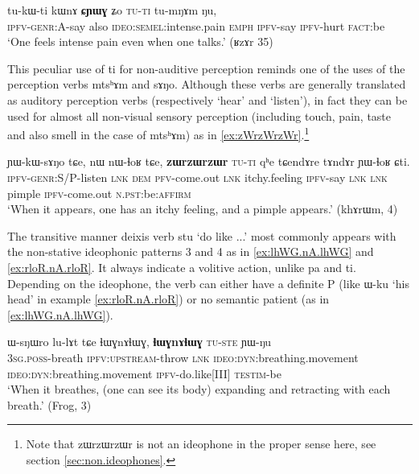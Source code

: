 \documentclass[oldfontcommands,oneside,a4paper,11pt]{article}
\newcommand{\ipa}[1]{{\phon \mbox{#1}}} %
\begin{document}
\begin{exe}
\ex \label{ex:CYWG.Zo}
\gll
\ipa{tu-kɯ-ti} 	\ipa{kɯnɤ} 	\ipa{\textbf{ɕɲɯɣ}} 	\ipa{ʑo} 	\textsc{\ipa{tu-ti}} 	\ipa{tu-mŋɤm} 	\ipa{ŋu,} \\
\textsc{ipfv-genr:A}-say also \textsc{ideo:semel}:intense.pain \textsc{emph} \textsc{ipfv}-say \textsc{ipfv}-hurt \textsc{fact}:be \\
\glt `One feels intense pain even when one talks.' (ʁzɤr 35)
\end{exe}

This peculiar use of \ipa{ti} for non-auditive perception reminds one of the uses of the perception verbs  \ipa{mtsʰɤm} and \ipa{sɤŋo}. Although these verbs are generally translated as auditory perception verbs (respectively `hear' and `listen'), in fact they    can be used for almost all  non-visual sensory perception (including touch, pain, taste and also smell in the case of    \ipa{mtsʰɤm}) as in \ref{ex:zWrzWrzWr}.\footnote{Note that \ipa{zɯrzɯrzɯr}  is not an ideophone in the proper sense here, see section \ref{sec:non.ideophones}. }
 
\begin{exe}
\ex \label{ex:zWrzWrzWr}
\gll
\ipa{ɲɯ-kɯ-sɤŋo} 	\ipa{tɕe,} 	\ipa{nɯ} 	\ipa{nɯ-ɬoʁ} 	\ipa{tɕe,} 	\ipa{\textbf{zɯrzɯrzɯr}} 	\textsc{\ipa{tu-ti}} 	\ipa{qʰe} 	\ipa{tɕendɤre} 	\ipa{tɤndɤr} 	\ipa{ɲɯ-ɬoʁ} 	\ipa{ɕti.} 	\\
\textsc{ipfv-genr}:S/P-listen \textsc{lnk} \textsc{dem} \textsc{pfv}-come.out \textsc{lnk} itchy.feeling \textsc{ipfv}-say \textsc{lnk}  \textsc{lnk} pimple \textsc{ipfv}-come.out \textsc{n.pst:}be:\textsc{affirm} \\
\glt `When it appears, one has an itchy feeling, and a pimple appears.' (khɤrɯm, 4)
\end{exe}

The transitive manner deixis verb \ipa{stu} `do like ...' most commonly appears with the non-stative ideophonic patterns 3 and 4 as in \ref{ex:lhWG.nA.lhWG} and \ref{ex:rloR.nA.rloR}. It always indicate a volitive action, unlike \ipa{pa} and \ipa{ti}. Depending on the ideophone, the verb can either have a definite P (like \ipa{ɯ-ku} `his head' in example \ref{ex:rloR.nA.rloR}) or no semantic patient (as in \ref{ex:lhWG.nA.lhWG}).

\begin{exe}
\ex \label{ex:lhWG.nA.lhWG}
\gll
\ipa{ɯ-sŋɯro} 	\ipa{lu-lɤt} 	\ipa{tɕe} 	\ipa{ɬɯɣnɤɬɯɣ,} 	\ipa{\textbf{ɬɯɣnɤɬɯɣ}} 	\textsc{\ipa{tu-ste}} 	\ipa{ɲɯ-ŋu} \\
\textsc{3sg.poss}-breath \textsc{ipfv:upstream}-throw \textsc{lnk} \textsc{ideo:dyn}:breathing.movement \textsc{ideo:dyn}:breathing.movement \textsc{ipfv}-do.like[III] \textsc{testim}-be \\
\glt `When it breathes, (one can see its body) expanding and retracting with each breath.' (Frog, 3)
\end{exe}
\end{document}
